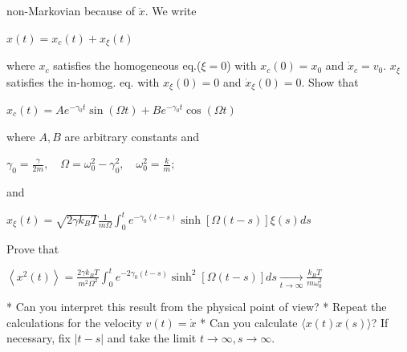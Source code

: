 non-Markovian because of $\ddot{x}$. We write
\begin{DispWithArrows}[displaystyle, format=c]
  $x(t)=x_{c}(t)+x_{\xi}(t)$
\end{DispWithArrows}
where $x_{c}$ satisfies the homogeneous eq.($\xi=0$) with $x_{c}(0)=x_{0}$ and
$\dot{x}_{c}=v_{0}$. $x_{\xi}$ satisfies the in-homog. eq. with
$x_{\xi}(0)=0$ and $\dot{x}_{\xi}(0)=0$.
Show that
\begin{DispWithArrows}[displaystyle, format=c]
  $x_{c}(t)=A e^{-\gamma_{0} t} \sin (\Omega t)+B e^{-\gamma_{0} t} \cos (\Omega t)$
\end{DispWithArrows}
where $A, B$ are arbitrary constants and
\begin{DispWithArrows}[displaystyle, format=c]
  $\gamma_{0}=\frac{\gamma}{2 m}, \quad \Omega=\omega_{0}^{2}-\gamma_{0}^{2}, \quad \omega_{0}^{2}=\frac{k}{m} ;$
\end{DispWithArrows}
and
\begin{DispWithArrows}[displaystyle, format=c]
  $x_{\xi}(t)=\sqrt{2 \gamma k_{B} T} \frac{1}{m \Omega} \int_{0}^{t} e^{-\gamma_{0}(t-s)} \sinh [\Omega(t-s)] \xi(s) d s$
\end{DispWithArrows}
Prove that
\begin{DispWithArrows}[displaystyle, format=c]
  $\left\langle x^{2}(t)\right\rangle=\frac{2 \gamma k_{B} T}{m^{2} \Omega^{2}} \int_{0}^{t} e^{-2 \gamma_{0}(t-s)} \sinh ^{2}[\Omega(t-s)] d s \underset{t \rightarrow \infty}{\longrightarrow} \frac{k_{B} T}{m \omega_{0}^{2}}$
\end{DispWithArrows}
    * Can you interpret this result from the physical point of view?
    * Repeat the calculations for the velocity $v(t)=\dot{x}$
    * Can you calculate $\langle x(t) x(s)\rangle$? If necessary, fix $|t-s|$ and
take the limit $t \rightarrow \infty, s \rightarrow \infty$.

